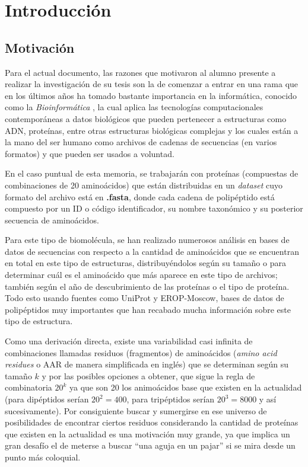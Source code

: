 \chapter*{Introducci\'on}

\section*{Motivación}

Para el actual documento, las razones que motivaron al alumno presente a realizar la investigación de su tesis son la de comenzar a 
entrar en una rama que en los últimos años ha tomado bastante importancia en la informática, conocido como la {\textit{Bioinformática}} \cite{bioinformatica}, la cual aplica las tecnologías computacionales contemporáneas a datos biológicos que pueden pertenecer a estructuras como ADN, proteínas, entre otras estructuras biológicas complejas y los cuales están a la mano del ser humano como archivos de cadenas de secuencias (en varios formatos) y que pueden ser usados a voluntad.

En el caso puntual de esta memoria, se trabajarán con proteínas (compuestas de combinaciones de 20 aminoácidos) que están distribuidas en un {\textit{dataset}} cuyo formato del archivo está en \textbf{.fasta}, donde cada cadena de polipéptido está compuesto por un ID o código identificador, su nombre taxonómico y su posterior secuencia de aminoácidos. 

Para este tipo de biomolécula, se han realizado numerosos análisis \cite{searching, array} en bases de datos de secuencias con respecto a la cantidad de aminoácidos que se encuentran en total en este tipo de estructuras, distribuyéndolos según su tamaño o para determinar cuál es el aminoácido que más aparece en este tipo de archivos; también según el año de descubrimiento de las proteínas o el tipo de proteína. Todo esto usando fuentes como UniProt y EROP-Moscow, bases de datos de polipéptidos muy importantes que han recabado mucha información sobre este tipo de estructura. 

Como una derivación directa, existe una variabilidad casi infinita de combinaciones llamadas residuos (fragmentos) de aminoácidos ({\textit{amino acid residues}} o AAR de manera simplificada en inglés) que se determinan según su tamaño $k$ y por las posibles opciones a obtener, que sigue la regla de combinatoria $20^{k}$ ya que son 20 los animoácidos base que existen en la actualidad (para dipéptidos serían $20^{2} = 400$, para tripéptidos serían $20^{3} = 8000$ y así sucesivamente). Por consiguiente buscar y sumergirse en ese universo de posibilidades de encontrar ciertos residuos considerando la cantidad de proteínas que existen en la actualidad es una motivación muy grande, ya que implica un gran desafío el de meterse a buscar ``una aguja en un pajar'' si se mira desde un punto más coloquial.